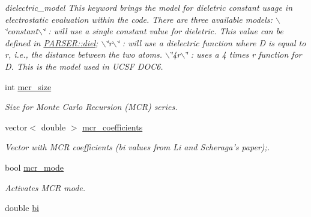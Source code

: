 \begin{DoxyCompactItemize}
\begin{DoxyCompactList}\small\item\em dielectric\_\-model This keyword brings the model for dieletric constant usage in electrostatic evaluation within the code. There are three available models: $\backslash$\char`\"{}constant$\backslash$\char`\"{} : will use a single constant value for dieletric. This value can be defined in \hyperlink{classPARSER_a810e7958f2e04522e6915962a9f1e3d9}{PARSER::diel}; $\backslash$\char`\"{}r$\backslash$\char`\"{} : will use a dielectric function where D is equal to r, i.e., the distance between the two atoms. $\backslash$\char`\"{}4r$\backslash$\char`\"{} : uses a 4 times r function for D. This is the model used in UCSF DOC6. \item\end{DoxyCompactList}\item 
\hypertarget{classPARSER_a99ecb75c6287ffa38f88f12129f851a5}{
int \hyperlink{classPARSER_a99ecb75c6287ffa38f88f12129f851a5}{mcr\_\-size}}
\label{classPARSER_a99ecb75c6287ffa38f88f12129f851a5}

\begin{DoxyCompactList}\small\item\em Size for Monte Carlo Recursion (MCR) series. \item\end{DoxyCompactList}\item 
\hypertarget{classPARSER_a60dee49e55f10bf3546df6005392810f}{
vector$<$ double $>$ \hyperlink{classPARSER_a60dee49e55f10bf3546df6005392810f}{mcr\_\-coefficients}}
\label{classPARSER_a60dee49e55f10bf3546df6005392810f}

\begin{DoxyCompactList}\small\item\em Vector with MCR coefficients (bi values from Li and Scheraga's paper);. \item\end{DoxyCompactList}\item 
\hypertarget{classPARSER_aee4757f16ee2110b0b7f2187c90737d6}{
bool \hyperlink{classPARSER_aee4757f16ee2110b0b7f2187c90737d6}{mcr\_\-mode}}
\label{classPARSER_aee4757f16ee2110b0b7f2187c90737d6}

\begin{DoxyCompactList}\small\item\em Activates MCR mode. \item\end{DoxyCompactList}\item 
\hypertarget{classPARSER_a1872e365e7db950c0472cfe55b89b784}{
double \hyperlink{classPARSER_a1872e365e7db950c0472cfe55b89b784}{bi}}
\label{classPARSER_a1872e365e7db950c0472cfe55b89b784}


\end{DoxyCompactItemize}
